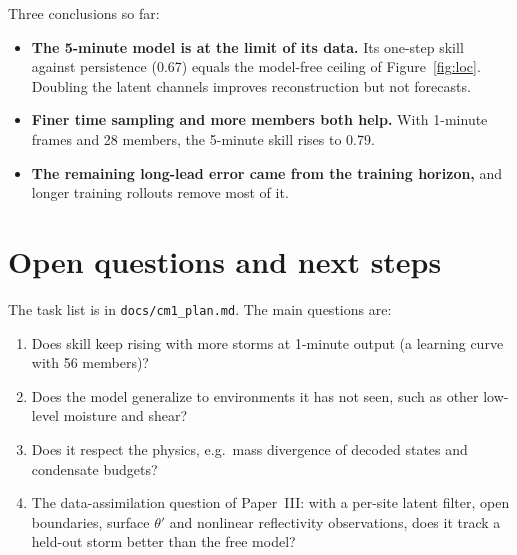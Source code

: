 \documentclass[11pt]{article}
\begin{document}
Three conclusions so far:
\begin{itemize}
\item \textbf{The 5-minute model is at the limit of its data.} Its one-step skill against persistence (0.67) equals the model-free ceiling of Figure~\ref{fig:loc}. Doubling the latent channels improves reconstruction but not forecasts.
\item \textbf{Finer time sampling and more members both help.} With 1-minute frames and 28 members, the 5-minute skill rises to 0.79.
\item \textbf{The remaining long-lead error came from the training horizon,} and longer training rollouts remove most of it.
\end{itemize}

\FloatBarrier
\section{Open questions and next steps}
The task list is in \texttt{docs/cm1\_plan.md}. The main questions are:
\begin{enumerate}
\item Does skill keep rising with more storms at 1-minute output (a learning curve with 56 members)?
\item Does the model generalize to environments it has not seen, such as other low-level moisture and shear?
\item Does it respect the physics, e.g.\ mass divergence of decoded states and condensate budgets?
\item The data-assimilation question of Paper~III: with a per-site latent filter, open boundaries, surface $\theta'$ and nonlinear reflectivity observations, does it track a held-out storm better than the free model?
\end{enumerate}
\end{document}
